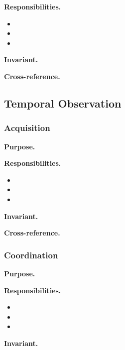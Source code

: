   \textbf{Responsibilities.}
  \begin{itemize}
    \item %
    \item %
    \item %
  \end{itemize}

  \textbf{Invariant.} %

  \textbf{Cross-reference.} %

\subsection{Temporal Observation}

  \subsubsection{Acquisition}
  \textbf{Purpose.} %

  \textbf{Responsibilities.}
  \begin{itemize}
    \item %
    \item %
    \item %
  \end{itemize}

  \textbf{Invariant.} %

  \textbf{Cross-reference.} %

  \subsubsection{Coordination}
  \textbf{Purpose.} %

  \textbf{Responsibilities.}
  \begin{itemize}
    \item %
    \item %
    \item %
  \end{itemize}

  \textbf{Invariant.} %

